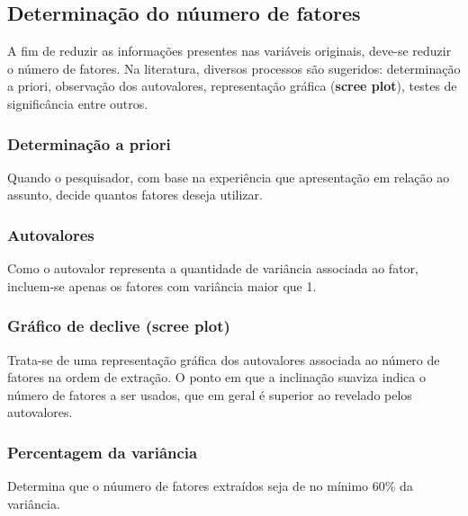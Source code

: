\documentclass[12pt,brazil,]{book}
\begin{document}
\hypertarget{determinacao-do-nuumero-de-fatores}{%
\subsection{Determinação do núumero de
fatores}\label{determinacao-do-nuumero-de-fatores}}

A fim de reduzir as informações presentes nas variáveis originais,
deve-se reduzir o número de fatores. Na literatura, diversos processos
são sugeridos: determinação a priori, observação dos autovalores,
representação gráfica (\textbf{scree plot}), testes de significância
entre outros.

\hypertarget{determinacao-a-priori}{%
\subsubsection{Determinação a priori}\label{determinacao-a-priori}}

Quando o pesquisador, com base na experiência que apresentação em
relação ao assunto, decide quantos fatores deseja utilizar.

\hypertarget{autovalores}{%
\subsubsection{Autovalores}\label{autovalores}}

Como o autovalor representa a quantidade de variância associada ao
fator, incluem-se apenas os fatores com variância maior que 1.

\hypertarget{grafico-de-declive-scree-plot}{%
\subsubsection{\texorpdfstring{Gráfico de declive (\textbf{scree
plot})}{Gráfico de declive (scree plot)}}\label{grafico-de-declive-scree-plot}}

Trata-se de uma representação gráfica dos autovalores associada ao
número de fatores na ordem de extração. O ponto em que a inclinação
suaviza indica o número de fatores a ser usados, que em geral é superior
ao revelado pelos autovalores.

\hypertarget{percentagem-da-variancia}{%
\subsubsection{Percentagem da
variância}\label{percentagem-da-variancia}}

Determina que o núumero de fatores extraídos seja de no mínimo 60\% da
variância.
\end{document}
